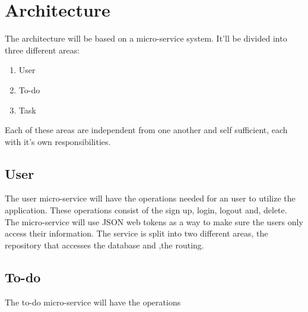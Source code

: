 \section{Architecture}

	The architecture will be based on a micro-service system. It'll be divided into three different areas:
	\begin{enumerate}
		\item User
		\item To-do
		\item Task
	\end{enumerate}


	Each of these areas are independent from one another and self sufficient, each with it's own responsibilities. 
	
	
	
	\subsection{User}
	The user micro-service will have the operations needed for an user to utilize the application. These operations consist of the sign up, login, logout and, delete.
	The micro-service will use JSON web tokens \cite{jwt} as a way to make sure the users only access their information.
	The service is split into two different areas, the repository\cite{repository_pattern} that accesses the database and ,the routing.
	
	
	\subsection{To-do}
	The to-do micro-service will have the operations
	 